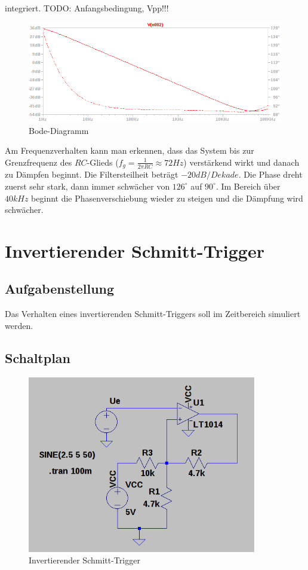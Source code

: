 \documentclass[12pt,a4paper,titlepage]{article}
\begin{document}
\noindent integriert. TODO: Anfangsbedingung, Vpp!!!


\begin{figure}[H]
  \centering
  \includegraphics[width=150mm]{integrierer_bode.png}
  \caption{Bode-Diagramm}
\end{figure}

\noindent Am Frequenzverhalten kann man erkennen, dass das System bis zur Grenzfrequenz des $RC$-Glieds ($f_g = \frac{1}{2\pi RC} \approx 72Hz$) verst\"arkend wirkt und danach zu D\"ampfen beginnt. Die Filtersteilheit betr\"agt $-20dB/Dekade$. Die Phase dreht zuerst sehr stark, dann immer schw\"acher von $126^{\circ}$ auf $90^{\circ}$. Im Bereich \"uber $40kHz$ beginnt die Phasenverschiebung wieder zu steigen und die D\"ampfung wird schw\"acher.

\section{Invertierender Schmitt-Trigger}

\subsection{Aufgabenstellung}
Das Verhalten eines invertierenden Schmitt-Triggers soll im Zeitbereich simuliert werden.

\subsection{Schaltplan}
\begin{figure}[H]
  \centering
  \includegraphics[width=100mm]{schmitt_schaltung.png}
  \caption{Invertierender Schmitt-Trigger}
\end{figure}
\end{document}
